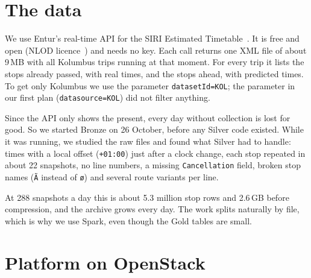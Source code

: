 \documentclass[11pt,a4paper]{article}
\newcommand{\code}[1]{\texttt{#1}}
\begin{document}
\section{The data}
\label{sec:data}

We use Entur's real-time API for the SIRI Estimated Timetable~\cite{entur}. It is free and
open (NLOD licence~\cite{nlod}) and needs no key. Each call returns one XML file of about 9\,MB
with all Kolumbus trips running at that moment. For every trip it lists the stops already
passed, with real times, and the stops ahead, with predicted times. To get only Kolumbus we
use the parameter \code{datasetId=KOL}; the parameter in our first plan
(\code{datasource=KOL}) did not filter anything.

Since the API only shows the present, every day without collection is lost for good. So we
started Bronze on 26 October, before any Silver code existed. While it was running, we studied
the raw files and found what Silver had to handle: times with a local offset (\code{+01:00})
just after a clock change, each stop repeated in about 22 snapshots, no line numbers, a missing
\code{Cancellation} field, broken stop names (\code{Ã} instead of \code{ø}) and several route
variants per line.

At 288 snapshots a day this is about 5.3 million stop rows and 2.6\,GB before compression,
and the archive grows every day. The work splits naturally by file, which is why we use Spark,
even though the Gold tables are small.

\section{Platform on OpenStack}
\label{sec:platform}
\end{document}
